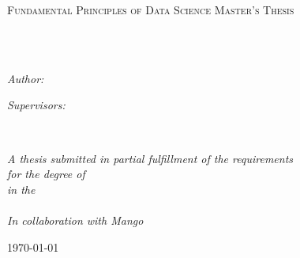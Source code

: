 \documentclass[
11pt, %
english, %
singlespacing, %
headsepline, %
]{MastersDoctoralThesis} %
\author{Joel Sanfeliu Ichihashi} %
\begin{document}
\frontmatter %

\pagestyle{plain} %


\begin{titlepage}
\begin{center}

\vspace*{.06\textheight}
{\scshape\LARGE \univname\par}\vspace{1.5cm} %
\textsc{\Large Fundamental Principles of Data Science Master's Thesis}\\[0.5cm] %

\HRule \\[0.4cm] %
{\huge \bfseries \ttitle\par}\vspace{0.4cm} %
\HRule \\[1.5cm] %
 
\begin{minipage}[t]{0.4\textwidth}
\begin{flushleft} \large
\emph{Author:}\\
\authorname %
\end{flushleft}
\end{minipage}
\begin{minipage}[t]{0.4\textwidth}
\begin{flushright} \large
\emph{Supervisors:} \\
\supname %
\end{flushright}
\end{minipage}\\[3cm]
 
\vfill

\large \textit{A thesis submitted in partial fulfillment of the requirements\\ for the degree of \degreename}\\[0.3cm] %
\textit{in the}\\[0.4cm]
\facname\\[0.8cm] %
\textit{In collaboration with Mango}\\[1.2cm]
 
\vfill

{\large \today}\\[4cm] %
 
\vfill
\end{center}
\end{titlepage}
\end{document}
